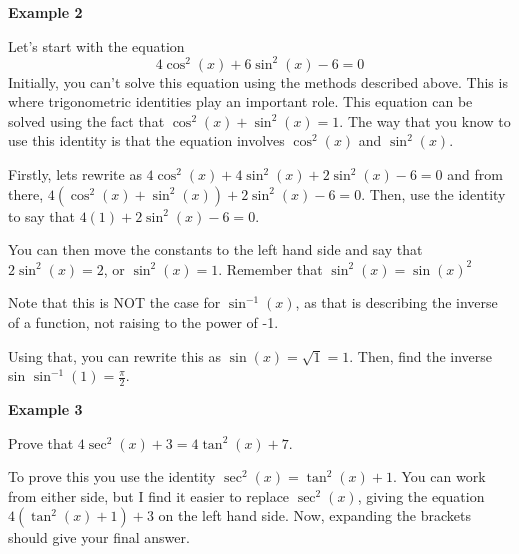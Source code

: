 \documentclass[
  12pt,
  a4paper, oneside]{starmastarticle}
\begin{document}
\begin{tcolorbox}[enhanced jigsaw, leftrule=.75mm, rightrule=.15mm, breakable, left=2mm, colback=white, bottomrule=.15mm, arc=.35mm, toprule=.15mm, opacityback=0, colframe=quarto-callout-note-color-frame]
\begin{minipage}[t]{5.5mm}
\textcolor{quarto-callout-note-color}{\faInfo}
\end{minipage}%
\begin{minipage}[t]{\textwidth - 5.5mm}

\textbf{Example 2}\vspace{2mm}

Let's start with the equation \[4\cos^{2}(x)+6\sin^{2}(x)-6=0\]
Initially, you can't solve this equation using the methods described
above. This is where trigonometric identities play an important role.
This equation can be solved using the fact that
\(\cos^{2}(x)+\sin^2(x)=1\). The way that you know to use this identity
is that the equation involves \(\cos^2(x)\) and \(\sin^2(x)\).

Firstly, lets rewrite as \(4\cos^2(x)+4\sin^2(x)+2\sin^2(x)-6=0\) and
from there, \(4(\cos^2(x)+\sin^2(x))+2\sin^2(x)-6=0\). Then, use the
identity to say that \(4(1)+2\sin^2(x)-6=0\).

You can then move the constants to the left hand side and say that
\(2\sin^2(x)= 2\), or \(\sin^2(x)=1\). Remember that
\(\sin^2(x)= {\sin(x)}^2\)

Note that this is NOT the case for \(\sin^{-1}(x)\), as that is
describing the inverse of a function, not raising to the power of -1.

Using that, you can rewrite this as \(\sin(x)=\sqrt{1}=1\). Then, find
the inverse sin \(\sin^{-1}(1)=\frac{\pi}{2}\).

\end{minipage}%
\end{tcolorbox}

\begin{tcolorbox}[enhanced jigsaw, leftrule=.75mm, rightrule=.15mm, breakable, left=2mm, colback=white, bottomrule=.15mm, arc=.35mm, toprule=.15mm, opacityback=0, colframe=quarto-callout-note-color-frame]
\begin{minipage}[t]{5.5mm}
\textcolor{quarto-callout-note-color}{\faInfo}
\end{minipage}%
\begin{minipage}[t]{\textwidth - 5.5mm}

\textbf{Example 3}\vspace{2mm}

Prove that \(4\sec^2(x)+3= 4\tan^2(x)+7\).

To prove this you use the identity \(\sec^2(x)=\tan^2(x)+1\). You can
work from either side, but I find it easier to replace \(\sec^2(x)\),
giving the equation \(4(\tan^2(x)+1)+3\) on the left hand side. Now,
expanding the brackets should give your final answer.

\end{minipage}%
\end{tcolorbox}
\end{document}
